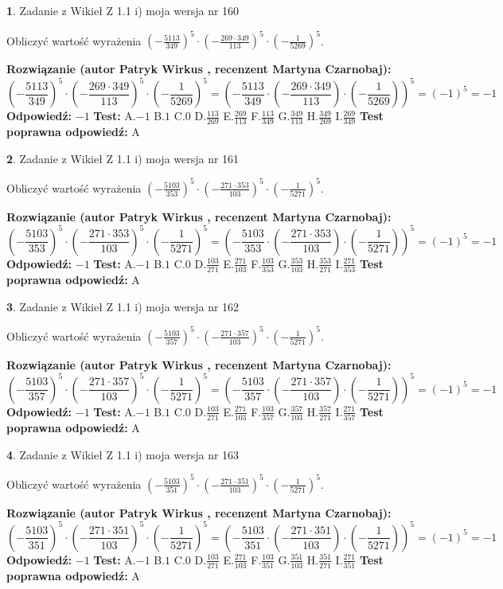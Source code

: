 \documentclass[12pt, a4paper]{article}
\theoremstyle{definition} %
\newtheorem{zad}{}
\newcommand{\zadStart}[1]{\begin{zad}#1\newline}
\newcommand{\zadStop}{\end{zad}}
\newcommand{\rozwStart}[2]{\noindent \textbf{Rozwiązanie (autor #1 , recenzent #2): }\newline}
\newcommand{\rozwStop}{\newline}
\newcommand{\odpStart}{\noindent \textbf{Odpowiedź:}\newline}
\newcommand{\odpStop}{\newline}
\newcommand{\testStart}{\noindent \textbf{Test:}\newline}
\newcommand{\testStop}{\newline}
\newcommand{\kluczStart}{\noindent \textbf{Test poprawna odpowiedź:}\newline}
\newcommand{\kluczStop}{\newline}
\begin{document}
\zadStart{Zadanie z Wikieł Z 1.1 i) moja wersja nr 160}

Obliczyć wartość wyrażenia $(-\frac{5113}{349})^{5} \cdot (-\frac{269 \cdot 349}{113})^{5} \cdot (-\frac{1}{5269})^{5}$.
\zadStop
\rozwStart{Patryk Wirkus}{Martyna Czarnobaj}
$$(-\frac{5113}{349})^{5} \cdot (-\frac{269 \cdot 349}{113})^{5} \cdot (-\frac{1}{5269})^{5} = (-\frac{5113}{349} \cdot (-\frac{269 \cdot 349}{113}) \cdot (-\frac{1}{5269}))^{5} = (-1)^{5} = -1$$
\rozwStop
\odpStart
$-1$
\odpStop
\testStart
A.$-1$ B.$1$ C.$0$ D.$\frac{113}{269}$ E.$\frac{269}{113}$
F.$\frac{113}{349}$ G.$\frac{349}{113}$
H.$\frac{349}{269}$
I.$\frac{269}{349}$
\testStop
\kluczStart
A
\kluczStop



\zadStart{Zadanie z Wikieł Z 1.1 i) moja wersja nr 161}

Obliczyć wartość wyrażenia $(-\frac{5103}{353})^{5} \cdot (-\frac{271 \cdot 353}{103})^{5} \cdot (-\frac{1}{5271})^{5}$.
\zadStop
\rozwStart{Patryk Wirkus}{Martyna Czarnobaj}
$$(-\frac{5103}{353})^{5} \cdot (-\frac{271 \cdot 353}{103})^{5} \cdot (-\frac{1}{5271})^{5} = (-\frac{5103}{353} \cdot (-\frac{271 \cdot 353}{103}) \cdot (-\frac{1}{5271}))^{5} = (-1)^{5} = -1$$
\rozwStop
\odpStart
$-1$
\odpStop
\testStart
A.$-1$ B.$1$ C.$0$ D.$\frac{103}{271}$ E.$\frac{271}{103}$
F.$\frac{103}{353}$ G.$\frac{353}{103}$
H.$\frac{353}{271}$
I.$\frac{271}{353}$
\testStop
\kluczStart
A
\kluczStop



\zadStart{Zadanie z Wikieł Z 1.1 i) moja wersja nr 162}

Obliczyć wartość wyrażenia $(-\frac{5103}{357})^{5} \cdot (-\frac{271 \cdot 357}{103})^{5} \cdot (-\frac{1}{5271})^{5}$.
\zadStop
\rozwStart{Patryk Wirkus}{Martyna Czarnobaj}
$$(-\frac{5103}{357})^{5} \cdot (-\frac{271 \cdot 357}{103})^{5} \cdot (-\frac{1}{5271})^{5} = (-\frac{5103}{357} \cdot (-\frac{271 \cdot 357}{103}) \cdot (-\frac{1}{5271}))^{5} = (-1)^{5} = -1$$
\rozwStop
\odpStart
$-1$
\odpStop
\testStart
A.$-1$ B.$1$ C.$0$ D.$\frac{103}{271}$ E.$\frac{271}{103}$
F.$\frac{103}{357}$ G.$\frac{357}{103}$
H.$\frac{357}{271}$
I.$\frac{271}{357}$
\testStop
\kluczStart
A
\kluczStop



\zadStart{Zadanie z Wikieł Z 1.1 i) moja wersja nr 163}

Obliczyć wartość wyrażenia $(-\frac{5103}{351})^{5} \cdot (-\frac{271 \cdot 351}{103})^{5} \cdot (-\frac{1}{5271})^{5}$.
\zadStop
\rozwStart{Patryk Wirkus}{Martyna Czarnobaj}
$$(-\frac{5103}{351})^{5} \cdot (-\frac{271 \cdot 351}{103})^{5} \cdot (-\frac{1}{5271})^{5} = (-\frac{5103}{351} \cdot (-\frac{271 \cdot 351}{103}) \cdot (-\frac{1}{5271}))^{5} = (-1)^{5} = -1$$
\rozwStop
\odpStart
$-1$
\odpStop
\testStart
A.$-1$ B.$1$ C.$0$ D.$\frac{103}{271}$ E.$\frac{271}{103}$
F.$\frac{103}{351}$ G.$\frac{351}{103}$
H.$\frac{351}{271}$
I.$\frac{271}{351}$
\testStop
\kluczStart
A
\kluczStop
\end{document}
